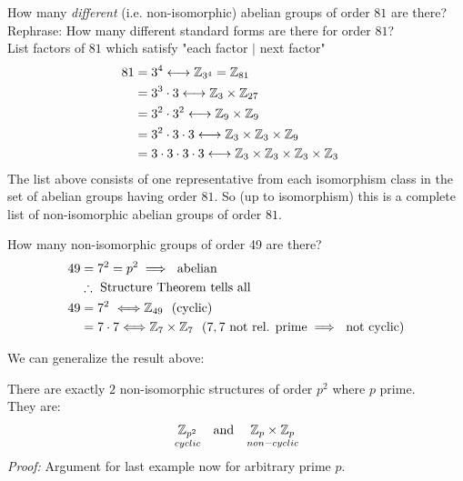 \begin{example}
How many \textit{different} (i.e. non-isomorphic) abelian groups of order $81$ are there? \\
Rephrase: How many different standard forms are there for order $81$? \\
List factors of $81$ which satisfy "each factor $|$ next factor"
\begin{align}
    81 &= 3^4 \longleftrightarrow {\mathbb{ Z}}_{3^4}={\mathbb{ Z}}_{81}& \nonumber \\
    &= 3^3\cdot 3 \longleftrightarrow {\mathbb{ Z}}_{3}\times{\mathbb{ Z}}_{27}& \nonumber \\
    &= 3^2\cdot 3^2 \longleftrightarrow {\mathbb{ Z}}_{9}\times {\mathbb{ Z}}_{9}& \nonumber \\
    &= 3^2\cdot 3\cdot 3 \longleftrightarrow {\mathbb{ Z}}_{3}\times {\mathbb{ Z}}_{3}\times {\mathbb{ Z}}_{9}& \nonumber \\
    &= 3\cdot 3\cdot 3\cdot 3 \longleftrightarrow {\mathbb{ Z}}_{3}\times {\mathbb{ Z}}_{3}\times {\mathbb{ Z}}_{3}\times {\mathbb{ Z}}_{3}& \nonumber 
\end{align}
The list above consists of one representative from each isomorphism class in the set of abelian groups having order $81$. So (up to isomorphism) this is a complete list of non-isomorphic abelian groups of order $81$.
\end{example}

\begin{example}
How many non-isomorphic groups of order 49 are there?
\begin{align}
    49&=7^2=p^2 \implies \ \text{abelian} \nonumber \\
    &\therefore \text{ Structure Theorem tells all} \nonumber \\
    49&= 7^2 \ \Longleftrightarrow {\mathbb{ Z}}_{49} \ \ (\text{cyclic}) \nonumber \\
    &= 7\cdot 7 \Longleftrightarrow {\mathbb{ Z}}_7\times {\mathbb{ Z}}_7 \ \ (7,7 \text{ not rel. prime} \implies \text{ not cyclic}) \nonumber
\end{align}
\end{example}
We can generalize the result above:
\begin{proposition} 
    There are exactly $2$ non-isomorphic structures of order $p^2$ where $p$ prime.\\ They are:
    \begin{align}
        \underset{cyclic}{\Z_{p^2}} \ \ \text{ and } \ \ \underset{non-cyclic}{\Z_{p}\times \Z_{p}} \nonumber
    \end{align}
    \textit{Proof:} Argument for last example now for arbitrary prime $p$.
\end{proposition}

